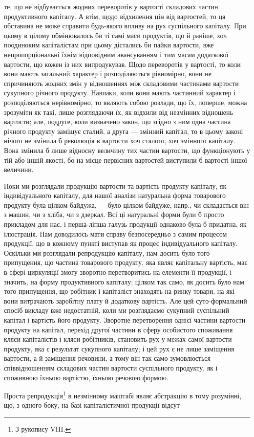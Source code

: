 те, що не відбувається жодних переворотів у вартості складових частин
продуктивного капіталу. А втім, щодо відхилення цін від вартостей, то
ця обставина не може справити будь-якого впливу на рух суспільного
капіталу. При цьому в цілому обмінювалось би ті самі маси продуктів,
що й раніше, хоч поодиноким капіталістам при цьому дістались би пайки
вартости, вже непропорціональні їхнім відповідним авансуванням і тим масам
додаткової вартости, що кожен із них випродукував. Щодо переворотів
у вартості, то коли вони мають загальний характер і розподіляються
рівномірно, вони не спричиняють жодних змін у відношеннях між
складовими частинами вартости сукупного річного продукту. Навпаки, коли
вони мають частинний характер і розподіляються нерівномірно, то являють
собою розлади, що їх, поперше, можна зрозуміти як такі, лише розглядаючи
їх, як відхили від незмінних відношень вартости; але, подруге,
коли визначено закон, що згідно з ним одна частина річного продукту заміщує
сталий, а друга — змінний капітал, то в цьому законі нічого не
змінила б революція в вартости хоч сталого, хоч змінного капіталу. Вона
змінила б лише відносну величину тих частин вартости, що функціонують
у тій або іншій якості, бо на місце первісних вартостей виступили
б вартості іншої величини.

Поки ми розглядали продукцію вартости та вартість продукту капіталу,
як індивідуального капіталу, для нашої аналізи натуральна форма
товарового продукту була цілком байдужа, — було цілком байдуже, напр.,
чи складається він з машин, чи з хліба, чи з дзеркал. Всі ці натуральні
форми були б просто прикладом для нас, і перша-ліпша галузь продукції
однаково була б придатна, як ілюстрація. Нам доводилось мати
справу безпосередньо з самим процесом продукції, що в кожному пункті
виступав як процес індивідуального капіталу. Оскільки ми розглядали
репродукцію капіталу, нам досить було того припущення, що частина
товарового продукту, яка являє капітальну вартість, має в сфері циркуляції
змогу зворотно перетворитись на елементи її продукції, і значить,
на форму продуктивного капіталу; цілком так само, як досить було нам
того припущення, що робітник і капіталіст знаходять на ринку товари,
на які вони витрачають заробітну плату й додаткову вартість. Але цей
суто-формальний спосіб викладу вже недостатній, коли ми розглядаємо
сукупний суспільний капітал і вартість його продукту. Зворотне перетворення
однієї частини вартости продукту на капітал, перехід другої частини в
сферу особистого споживання кляси капіталістів і кляси робітників, становить
рух у межах самої вартости продукту, яка є результат сукупного
капіталу; і цей рух є не лише заміщення вартости, а й заміщення речовини,
а тому він так само зумовлюється співвідношенням складових
частин вартости суспільного продукту, як і споживною їхньою вартістю,
їхньою речовою формою.

Проста репродукція\footnote{
З рукопису VIII.
} в незмінному маштабі являє абстракцію в тому
розумінні, що, з одного боку, на базі капіталістичної продукції відсут-